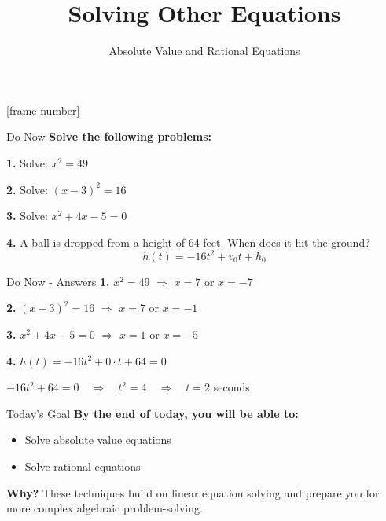 \documentclass[12pt]{beamer}
\title{Solving Other Equations}
\subtitle{Absolute Value and Rational Equations}
\date{}
\begin{document}
[frame number]

\frame{\titlepage}

\begin{frame}{Do Now}
\textbf{Solve the following problems:}

\vspace{0.5cm}

\textbf{1.} Solve: $x^2 = 49$

\vspace{0.5cm}

\textbf{2.} Solve: $(x-3)^2 = 16$

\vspace{0.5cm}

\textbf{3.} Solve: $x^2 + 4x - 5 = 0$

\vspace{0.5cm}

\textbf{4.} A ball is dropped from a height of 64 feet. When does it hit the ground?
$$h(t) = -16t^2 + v_0t + h_0$$
\end{frame}

\begin{frame}{Do Now - Answers}
\textbf{1.} $x^2 = 49$ \quad $\Rightarrow$ \quad $x = 7$ or $x = -7$

\vspace{0.5cm}

\textbf{2.} $(x-3)^2 = 16$ \quad $\Rightarrow$ \quad $x = 7$ or $x = -1$

\vspace{0.5cm}

\textbf{3.} $x^2 + 4x - 5 = 0$ \quad $\Rightarrow$ \quad $x = 1$ or $x = -5$

\vspace{0.5cm}

\textbf{4.} $h(t) = -16t^2 + 0 \cdot t + 64 = 0$

$-16t^2 + 64 = 0 \quad \Rightarrow \quad t^2 = 4 \quad \Rightarrow \quad t = 2$ seconds
\end{frame}

\begin{frame}{Today's Goal}
\Large
\textbf{By the end of today, you will be able to:}

\vspace{0.5cm}

\normalsize
\begin{itemize}
\item Solve absolute value equations
\item Solve rational equations
\end{itemize}

\vspace{0.5cm}

\textbf{Why?} These techniques build on linear equation solving and prepare you for more complex algebraic problem-solving.
\end{frame}
\end{document}
